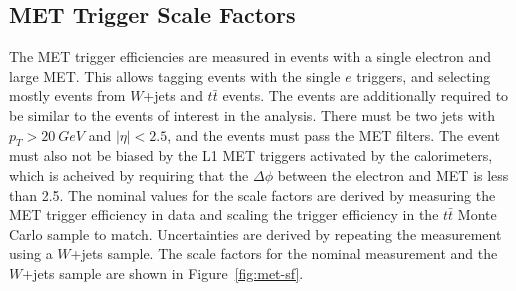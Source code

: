 \subsection{MET Trigger Scale Factors}

The MET trigger efficiencies are measured in events with a single electron and large MET.
This allows tagging events with the single $e$ triggers, and selecting mostly
events from $W$+jets and $t\bar{t}$ events.
The events are additionally required to be similar to the events of interest in the analysis.
There must be two jets with $p_T > \SI{20}{GeV}$ and $|\eta| < 2.5$,
and the events must pass the MET filters.
The event must also not be biased by the L1 MET triggers activated by the calorimeters,
which is acheived by requiring that the $\Delta\phi$ between the electron and MET is
less than 2.5.
The nominal values for the scale factors are derived by measuring
the MET trigger efficiency in data and scaling the trigger efficiency in
the $t\bar{t}$ Monte Carlo sample to match.
Uncertainties are derived by repeating the measurement using a $W$+jets sample.
The scale factors for the nominal measurement and the $W$+jets sample are shown in
Figure~\ref{fig:met-sf}.
